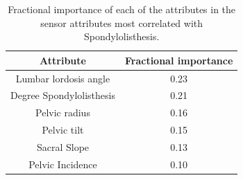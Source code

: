 \documentclass[10pt]{article}
\begin{document}
\begin{table}
\center
\caption{Fractional importance of each of the attributes in the sensor attributes most correlated with Spondylolisthesis.}
\begin{tabular}{cc}
\hline
Attribute & Fractional importance \\
\hline 
\hline
Lumbar lordosis angle & 0.23 \\
Degree Spondylolisthesis & 0.21 \\
Pelvic radius & 0.16 \\
Pelvic tilt & 0.15 \\
Sacral Slope & 0.13 \\
Pelvic Incidence & 0.10 \\
\hline
\end{tabular}
\label{tab_import}
\end{table}
\end{document}
